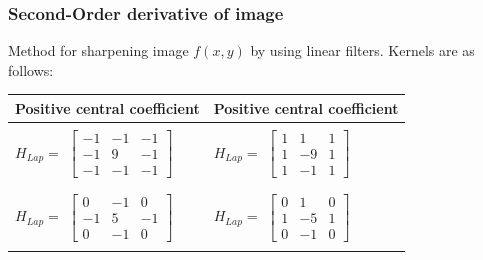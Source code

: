 \documentclass[english,11pt,table,handout]{beamer}
\begin{document}
{
	\frametitle{Second-Order derivative of image}
	Method for sharpening  image $f(x,y)$ by using linear filters. Kernels are as follows:
	\newline
	
	\begin{tabular}{|l|l|}
		\hline
		\textbf{Positive central coefficient} & \textbf{Positive central coefficient} \\
		\hline
			& \\
			$H_{Lap} = $ $\left[ 
			\begin{array}{rrr} 
			-1 & -1 & -1 \\
			-1 & 9 & -1\\
			-1 & -1 & -1
			\end{array}\right] $ &
			$H_{Lap} = $ $\left[ 
			\begin{array}{rrr} 
			1 & 1 & 1 \\
			1 & -9 & 1\\
			1 & -1 & 1
			\end{array}\right] $ \\
			& \\
		\hline
			& \\
			$H_{Lap} = $ $\left[ 
			\begin{array}{rrr} 
			0 & -1 & 0 \\
			-1 & 5 & -1\\
			0 & -1 & 0
			\end{array}\right] $ &
			$H_{Lap} = $ $\left[ 
			\begin{array}{rrr} 
			0 & 1 & 0 \\
			1 & -5 & 1\\
			0 & -1 & 0
			\end{array}\right] $ \\
			& \\
			\hline
	\end{tabular}

	
	
}
\frame
\end{document}

